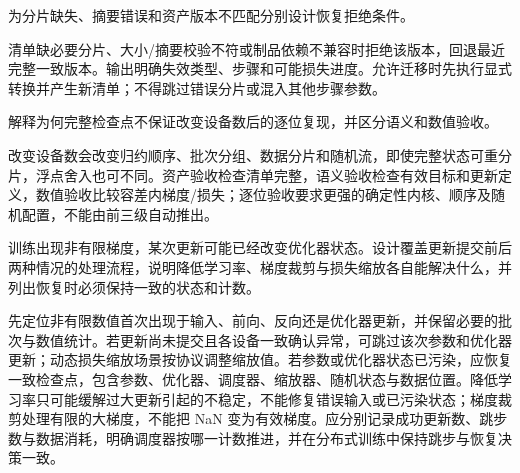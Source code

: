 \begin{exercises}
\begin{exercise} 为分片缺失、摘要错误和资产版本不匹配分别设计恢复拒绝条件。

\begin{solution}
清单缺必要分片、大小/摘要校验不符或制品依赖不兼容时拒绝该版本，回退最近完整一致版本。输出明确失效类型、步骤和可能损失进度。允许迁移时先执行显式转换并产生新清单；不得跳过错误分片或混入其他步骤参数。
\end{solution}
\end{exercise}

\begin{exercise}\optional 解释为何完整检查点不保证改变设备数后的逐位复现，并区分语义和数值验收。

\begin{solution}
改变设备数会改变归约顺序、批次分组、数据分片和随机流，即使完整状态可重分片，浮点舍入也可不同。资产验收检查清单完整，语义验收检查有效目标和更新定义，数值验收比较容差内梯度/损失；逐位验收要求更强的确定性内核、顺序及随机配置，不能由前三级自动推出。
\end{solution}
\end{exercise}

\begin{exercise} 训练出现非有限梯度，某次更新可能已经改变优化器状态。设计覆盖更新提交前后两种情况的处理流程，说明降低学习率、梯度裁剪与损失缩放各自能解决什么，并列出恢复时必须保持一致的状态和计数。

\begin{solution}
先定位非有限数值首次出现于输入、前向、反向还是优化器更新，并保留必要的批次与数值统计。若更新尚未提交且各设备一致确认异常，可跳过该次参数和优化器更新；动态损失缩放场景按协议调整缩放值。若参数或优化器状态已污染，应恢复一致检查点，包含参数、优化器、调度器、缩放器、随机状态与数据位置。降低学习率只可能缓解过大更新引起的不稳定，不能修复错误输入或已污染状态；梯度裁剪处理有限的大梯度，不能把 NaN 变为有效梯度。应分别记录成功更新数、跳步数与数据消耗，明确调度器按哪一计数推进，并在分布式训练中保持跳步与恢复决策一致。
\end{solution}
\end{exercise}

\end{exercises}
